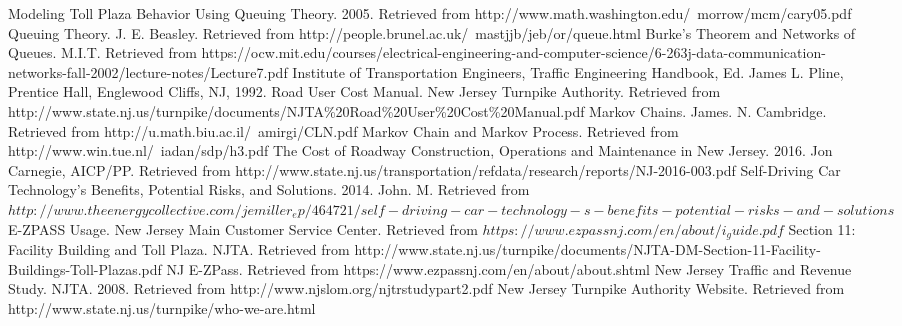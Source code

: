 \begin{thebibliography}{99}
\raggedright
{} Modeling Toll Plaza Behavior Using Queuing Theory. 2005. Retrieved from http://www.math.washington.edu/~morrow/mcm/cary05.pdf
 Queuing Theory. J. E. Beasley. Retrieved from http://people.brunel.ac.uk/~mastjjb/jeb/or/queue.html
 Burke's Theorem and Networks of Queues. M.I.T. Retrieved from https://ocw.mit.edu/courses/electrical-engineering-and-computer-science/6-263j-data-communication-networks-fall-2002/lecture-notes/Lecture7.pdf
 Institute of Transportation Engineers, Traffic Engineering Handbook, Ed. James L. Pline, Prentice Hall, Englewood Cliffs, NJ, 1992.
 Road User Cost Manual. New Jersey Turnpike Authority. Retrieved from http://www.state.nj.us/turnpike/documents/NJTA\%20Road\%20User\%20Cost\%20Manual.pdf
 Markov Chains. James. N. Cambridge. Retrieved from http://u.math.biu.ac.il/~amirgi/CLN.pdf
 Markov Chain and Markov Process. Retrieved from http://www.win.tue.nl/~iadan/sdp/h3.pdf
 The Cost of Roadway Construction, Operations and Maintenance in New Jersey. 2016. Jon Carnegie, AICP/PP. Retrieved from http://www.state.nj.us/transportation/refdata/research/reports/NJ-2016-003.pdf
 Self-Driving Car Technology’s Benefits, Potential Risks, and Solutions. 2014. John. M. Retrieved from $http://www.theenergycollective.com/jemiller_ep/464721/self-driving-car-technology-s-benefits-potential-risks-and-solutions$
 E-ZPASS Usage. New Jersey Main Customer Service Center. Retrieved from $https://www.ezpassnj.com/en/about/i_guide.pdf$
 Section 11: Facility Building and Toll Plaza. NJTA. Retrieved from http://www.state.nj.us/turnpike/documents/NJTA-DM-Section-11-Facility-Buildings-Toll-Plazas.pdf
 NJ E-ZPass. Retrieved from https://www.ezpassnj.com/en/about/about.shtml
 New Jersey Traffic and Revenue Study. NJTA. 2008. Retrieved from http://www.njslom.org/njtrstudypart2.pdf
 New Jersey Turnpike Authority Website. Retrieved from http://www.state.nj.us/turnpike/who-we-are.html
\end{thebibliography}